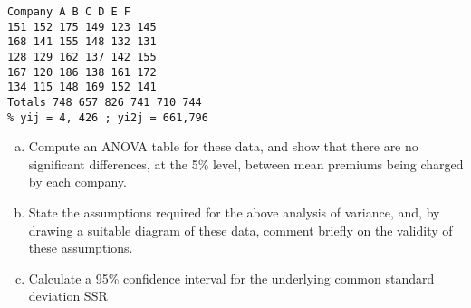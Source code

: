 \documentclass[a4paper,12pt]{article}
\begin{document}
\begin{enumerate}
\begin{verbatim}
Company A B C D E F
151 152 175 149 123 145
168 141 155 148 132 131
128 129 162 137 142 155
167 120 186 138 161 172
134 115 148 169 152 141
Totals 748 657 826 741 710 744
% yij = 4, 426 ; yi2j = 661,796
\end{verbatim}


\begin{enumerate}[(a)]
\item Compute an ANOVA table for these data, and show that there are no
significant differences, at the 5\% level, between mean premiums being
charged by each company. 
\item State the assumptions required for the above analysis of variance, and, by
drawing a suitable diagram of these data, comment briefly on the validity of
these assumptions. 
\item Calculate a 95\% confidence interval for the underlying common standard
deviation %
SSR


\end{enumerate}
\end{enumerate}
\end{document}
